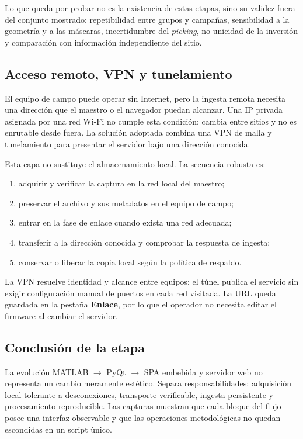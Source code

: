 Lo que queda por probar no es la existencia de estas etapas, sino su validez fuera del
conjunto mostrado: repetibilidad entre grupos y campa\~nas, sensibilidad a la geometr\'ia
y a las m\'ascaras, incertidumbre del \emph{picking}, no unicidad de la inversi\'on y
comparaci\'on con informaci\'on independiente del sitio.

\clearpage
\subsection{Acceso remoto, VPN y tunelamiento}

El equipo de campo puede operar sin Internet, pero la ingesta remota necesita
una direcci\'on que el maestro o el navegador puedan alcanzar. Una IP privada
asignada por una red Wi-Fi no cumple esta condici\'on: cambia entre sitios y no
es enrutable desde fuera. La soluci\'on adoptada combina una VPN de malla y
tunelamiento para presentar el servidor bajo una direcci\'on conocida.

Esta capa no sustituye el almacenamiento local. La secuencia robusta es:

\begin{enumerate}
  \item adquirir y verificar la captura en la red local del maestro;
  \item preservar el archivo y sus metadatos en el equipo de campo;
  \item entrar en la fase de enlace cuando exista una red adecuada;
  \item transferir a la direcci\'on conocida y comprobar la respuesta de ingesta;
  \item conservar o liberar la copia local seg\'un la pol\'itica de respaldo.
\end{enumerate}

La VPN resuelve identidad y alcance entre equipos; el t\'unel publica el servicio
sin exigir configuraci\'on manual de puertos en cada red visitada. La URL queda
guardada en la pesta\~na \textbf{Enlace}, por lo que el operador no necesita
editar el firmware al cambiar el servidor.

\subsection{Conclusi\'on de la etapa}

La evoluci\'on MATLAB $\rightarrow$ PyQt $\rightarrow$ SPA embebida y servidor
web no representa un cambio meramente est\'etico. Separa responsabilidades:
adquisici\'on local tolerante a desconexiones, transporte verificable, ingesta
persistente y procesamiento reproducible. Las capturas muestran que cada bloque
del flujo posee una interfaz observable y que las operaciones metodol\'ogicas no
quedan escondidas en un script \`unico.


